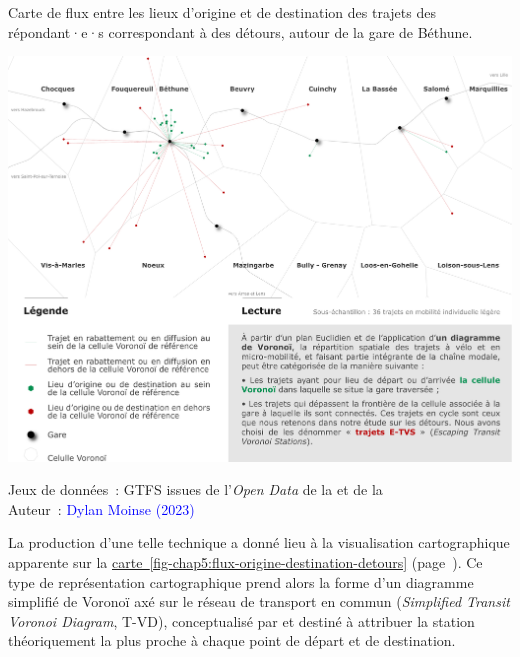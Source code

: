 \begin{refsegment}
    \begin{carte}[h!]\vspace*{4pt}
        \caption{Carte de flux entre les lieux d'origine et de destination des trajets des répondant·e·s correspondant à des détours, autour de la gare de Béthune.}
        \label{fig-chap5:flux-origine-destination-detours}
        \centerline{\includegraphics[width=1\columnwidth]{src/Figures/Chap-5/FR_Detours_Diagramme_Voronoi.pdf}}
        \vspace{5pt}
        \begin{flushright}\scriptsize{
        Jeux de données~: \acrshort{GTFS} issues de l'\textsl{Open Data} de la \textcolor{blue}{\textcite{sncf_sncf_2022}} et de la \textcolor{blue}{\textcite{metropole_europeenne_de_lille_opendata_2021}}
        \\
        Auteur~: \textcolor{blue}{Dylan Moinse (2023)}
        }\end{flushright}
    \end{carte}

La production d'une telle technique a donné lieu à la visualisation cartographique apparente sur la \hyperref[fig-chap5:flux-origine-destination-detours]{carte~\ref{fig-chap5:flux-origine-destination-detours}} (page~\pageref{fig-chap5:flux-origine-destination-detours}). Ce type de représentation cartographique prend alors la forme d'un diagramme simplifié de Voronoï axé sur le réseau de transport en commun (\textsl{Simplified Transit Voronoi Diagram}, T-VD), conceptualisé par \textcolor{blue}{\textcite[5]{chen_transit_2022}} et destiné à attribuer la station théoriquement la plus proche à chaque point de départ et de destination.%


\end{refsegment}
